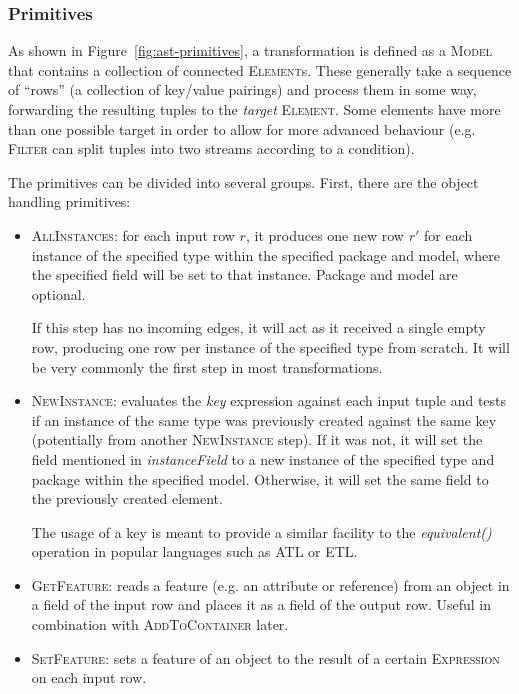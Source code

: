 \documentclass[a4paper]{scrartcl}
\newcommand*{\class}[1]{\textsc{#1}}
\begin{document}
\subsubsection{Primitives}

As shown in Figure~\ref{fig:ast-primitives}, a transformation is
defined as a \class{Model} that contains a collection of connected
\class{Element}s. These generally take a sequence of ``rows'' (a
collection of key/value pairings) and process them in some way,
forwarding the resulting tuples to the \emph{target}
\class{Element}. Some elements have more than one possible target in
order to allow for more advanced behaviour (e.g. \class{Filter} can
split tuples into two streams according to a condition).


The primitives can be divided into several groups. First, there are
the object handling primitives:

\begin{itemize}
\item \class{AllInstances}: for each input row $r$, it produces one
  new row $r'$ for each instance of the specified type within the
  specified package and model, where the specified field will be set
  to that instance. Package and model are optional.

  If this step has no incoming edges, it will act as it received a
  single empty row, producing one row per instance of the specified
  type from scratch. It will be very commonly the first step in most
  transformations.

\item \class{NewInstance}: evaluates the \emph{key} expression against
  each input tuple and tests if an instance of the same type was
  previously created against the same key (potentially from another
  \class{NewInstance} step). If it was not, it will set the field
  mentioned in \emph{instanceField} to a new instance of the specified
  type and package within the specified model. Otherwise, it will set
  the same field to the previously created element.

  The usage of a key is meant to provide a similar facility to the
  \emph{equivalent()} operation in popular languages such as ATL or
  ETL.

\item \class{GetFeature}: reads a feature (e.g. an attribute or
  reference) from an object in a field of the input row and places it
  as a field of the output row. Useful in combination with
  \class{AddToContainer} later.

\item \class{SetFeature}: sets a feature of an object to the result of
  a certain \class{Expression} on each input row.
\end{itemize}
\end{document}

